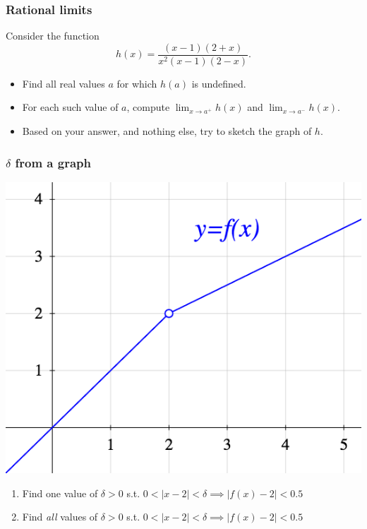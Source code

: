 \documentclass[14pt]{beamer}
\begin{document}
	\begin{frame}[t]
		\frametitle{Rational limits}

		Consider the function
		\[
			h(x) = \frac{(x-1)(2+x)}{x^{2}(x-1)(2-x)}.
		\]
		\begin{itemize}
			\item Find all real values $a$ for which $h(a)$ is undefined. \\

			\item For each such value of $a$, compute
				$\displaystyle \lim_{x \to a^+}h(x)$ and
				$\displaystyle \lim_{x \to a^-}h(x)$. \\

			\item Based on your answer, and nothing else, try to sketch the graph of $h$.
		\end{itemize}
	\end{frame}

	\begin{frame}[t]
		\frametitle{$\delta$ from a graph}
		\fontsize{11}{11}\selectfont
		\begin{center}
			\includegraphics[scale=.3]{G3}
		\end{center}
		\begin{enumerate}
			\item Find one value of $\delta>0$ s.t. \hfill
				$\displaystyle 0 < |x-2| < \delta \implies |f(x) - 2| < 0.5$

			\item Find \emph{all} values of $\delta>0$ s.t. \hfill $\displaystyle 0 < |
				x-2| < \delta \implies |f(x) - 2| < 0.5$
		\end{enumerate}
	\end{frame}
\end{document}
